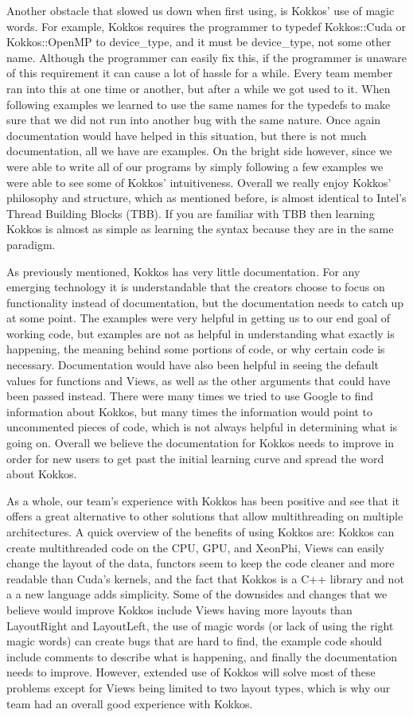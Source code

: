 Another obstacle that slowed us down when first using, is Kokkos' use of magic
words. For example, Kokkos requires the programmer to typedef Kokkos::Cuda or
Kokkos::OpenMP to device\_type, and it must be device\_type, not some other
name. Although the programmer can easily fix this, if the programmer is unaware
of this requirement it can cause a lot of hassle for a while. Every team member
ran into this at one time or another, but after a while we got used to it. When
following examples we learned to use the same names for the typedefs to make
sure that we did not run into another bug with the same nature. Once again
documentation would have helped in this situation, but there is not much
documentation, all we have are examples. On the bright side however, since we
were able to write all of our programs by simply following a few examples we
were able to see some of Kokkos' intuitiveness. Overall we really enjoy Kokkos'
philosophy and structure, which as mentioned before, is almost identical to
Intel's Thread Building Blocks (TBB). If you are familiar with TBB then learning
Kokkos is almost as simple as learning the syntax because they are in the same
paradigm. 

As previously mentioned, Kokkos has very little documentation. For any emerging
technology it is understandable that the creators choose to focus on
functionality instead of documentation, but the documentation needs to catch up
at some point. The examples were very helpful in getting us to our end goal of
working code, but examples are not as helpful in understanding what exactly is
happening, the meaning behind some portions of code, or why certain code is
necessary. Documentation would have also been helpful in seeing the default
values for functions and Views, as well as the other arguments that could have
been passed instead. There were many times we tried to use Google to find
information about Kokkos, but many times the information would point to
uncommented pieces of code, which is not always helpful in determining what is
going on. Overall we believe the documentation for Kokkos needs to improve in
order for new users to get past the initial learning curve and spread the word
about Kokkos. 

As a whole, our team's experience with Kokkos has been positive and see that it
offers a great alternative to other solutions that allow multithreading on
multiple architectures. A quick overview of the benefits of using Kokkos are:
Kokkos can create multithreaded code on the CPU, GPU, and XeonPhi, Views can
easily change the layout of the data, functors seem to keep the code cleaner and
more readable than Cuda's kernels, and the fact that Kokkos is a C++ library and
not a a new language adds simplicity. Some of the downsides and changes that we
believe would improve Kokkos include Views having more layouts than LayoutRight
and LayoutLeft, the use of magic words (or lack of using the right magic words)
can create bugs that are hard to find, the example code should include comments
to describe what is happening, and finally the documentation needs to improve.
However, extended use of Kokkos will solve most of these problems except for
Views being limited to two layout types, which is why our team had an overall
good experience with Kokkos.

